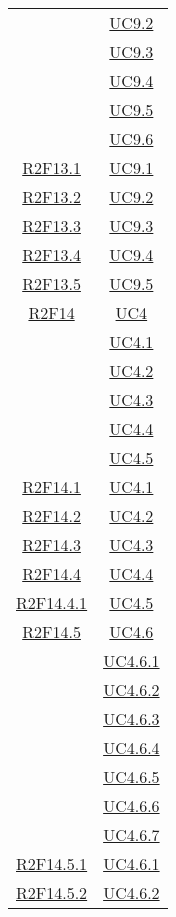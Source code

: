 \begin{longtable}{|c|c|}
& \hyperlink{UC9.2}{UC9.2}\\
& \hyperlink{UC9.3}{UC9.3}\\
& \hyperlink{UC9.4}{UC9.4}\\
& \hyperlink{UC9.5}{UC9.5}\\
& \hyperlink{UC9.6}{UC9.6}\\
\hline
\hyperlink{R2F13.1}{R2F13.1} & \hyperlink{UC9.1}{UC9.1}\\
\hline
\hyperlink{R2F13.2}{R2F13.2} & \hyperlink{UC9.2}{UC9.2}\\
\hline
\hyperlink{R2F13.3}{R2F13.3} & \hyperlink{UC9.3}{UC9.3}\\
\hline
\hyperlink{R2F13.4}{R2F13.4} & \hyperlink{UC9.4}{UC9.4}\\
\hline
\hyperlink{R2F13.5}{R2F13.5} & \hyperlink{UC9.5}{UC9.5}\\
\hline
\hyperlink{R2F14}{R2F14} & \hyperlink{UC4}{UC4}\\
& \hyperlink{UC4.1}{UC4.1}\\
& \hyperlink{UC4.2}{UC4.2}\\
& \hyperlink{UC4.3}{UC4.3}\\
& \hyperlink{UC4.4}{UC4.4}\\
& \hyperlink{UC4.5}{UC4.5}\\
\hline
\hyperlink{R2F14.1}{R2F14.1} & \hyperlink{UC4.1}{UC4.1}\\
\hline
\hyperlink{R2F14.2}{R2F14.2} & \hyperlink{UC4.2}{UC4.2}\\
\hline
\hyperlink{R2F14.3}{R2F14.3} & \hyperlink{UC4.3}{UC4.3}\\
\hline
\hyperlink{R2F14.4}{R2F14.4} & \hyperlink{UC4.4}{UC4.4}\\
\hline
\hyperlink{R2F14.4.1}{R2F14.4.1} & \hyperlink{UC4.5}{UC4.5}\\
\hline
\hyperlink{R2F14.5}{R2F14.5} & \hyperlink{UC4.6}{UC4.6}\\
& \hyperlink{UC4.6.1}{UC4.6.1}\\
& \hyperlink{UC4.6.2}{UC4.6.2}\\
& \hyperlink{UC4.6.3}{UC4.6.3}\\
& \hyperlink{UC4.6.4}{UC4.6.4}\\
& \hyperlink{UC4.6.5}{UC4.6.5}\\
& \hyperlink{UC4.6.6}{UC4.6.6}\\
& \hyperlink{UC4.6.7}{UC4.6.7}\\
\hline
\hyperlink{R2F14.5.1}{R2F14.5.1} & \hyperlink{UC4.6.1}{UC4.6.1}\\
\hline
\hyperlink{R2F14.5.2}{R2F14.5.2} & \hyperlink{UC4.6.2}{UC4.6.2}\\

\end{longtable}
